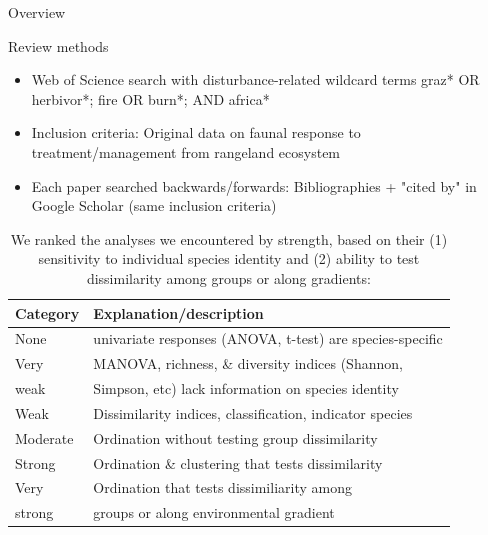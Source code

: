 \documentclass[final]{beamer}\usepackage[]{graphicx}\usepackage[]{color}
\newlength{\sepwid}
\newlength{\onecolwid}
\begin{document}
\begin{frame}[t]
\begin{columns}[t]
\begin{column}{\onecolwid}
\begin{alertblock}{Overview}
\begin{itemize}
\end{itemize}
\end{alertblock}


\begin{block}{Review methods}
\small{
\begin{itemize}
\item Web of Science search with disturbance-related wildcard terms graz* OR herbivor*; fire OR burn*; AND africa*
\item Inclusion criteria: Original data on faunal response to treatment/management from rangeland ecosystem
\item Each paper searched backwards/forwards: Bibliographies + "cited by" in Google Scholar (same inclusion criteria)
\end{itemize}}
\begin{table}
\small
\caption{We ranked the analyses we encountered by strength, based on their (1) sensitivity to individual species identity and (2) ability to test dissimilarity among groups or along gradients:}
\begin{tabular}{l l}
\toprule
\textbf{Category} & \textbf{Explanation/description} \\ \midrule
None & univariate responses (ANOVA, t-test) are species-specific \\ \midrule
Very & MANOVA, richness, \& diversity indices (Shannon, \\
weak & Simpson, etc) lack information on species identity  \\ \midrule
Weak & Dissimilarity indices, classification, indicator species\\ 
\midrule
Moderate  & Ordination without testing group dissimilarity \\ \midrule
Strong    & Ordination \& clustering that tests dissimilarity\\ \midrule
Very      & Ordination that tests dissimiliarity among \\
  strong  & groups or along environmental gradient \\ \bottomrule
\end{tabular}
\end{table}

\end{block}



\end{column} %
\begin{column}{\sepwid}\end{column} %


\end{columns}
\end{frame}
\end{document}
